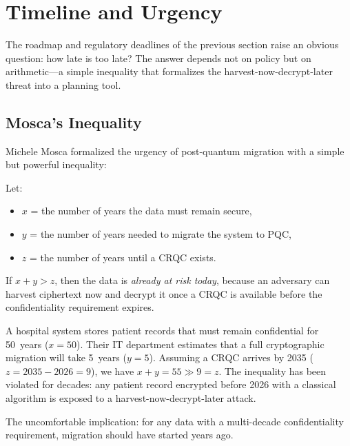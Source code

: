 \section{Timeline and Urgency}
\label{sec:timeline}

The roadmap and regulatory deadlines of the previous section raise an obvious question: how late is too late?  The answer depends not on policy but on arithmetic---a simple inequality that formalizes the harvest-now-decrypt-later threat into a planning tool.

\subsection{Mosca's Inequality}
\label{subsec:mosca}

Michele Mosca formalized the urgency of post-quantum migration with a simple but powerful inequality:

\begin{definition}
\label{def:mosca}
Let:
\begin{itemize}
\item $x$ = the number of years the data must remain secure,
\item $y$ = the number of years needed to migrate the system to PQC,
\item $z$ = the number of years until a CRQC exists.
\end{itemize}
If $x + y > z$, then the data is \emph{already at risk today}, because an adversary can harvest ciphertext now and decrypt it once a CRQC is available before the confidentiality requirement expires.
\end{definition}

\begin{example}
\label{ex:mosca-hospital}
A hospital system stores patient records that must remain confidential for 50~years ($x = 50$).  Their IT department estimates that a full cryptographic migration will take 5~years ($y = 5$).  Assuming a CRQC arrives by 2035 ($z = 2035 - 2026 = 9$), we have $x + y = 55 \gg 9 = z$.  The inequality has been violated for decades: any patient record encrypted before 2026 with a classical algorithm is exposed to a harvest-now-decrypt-later attack.
\end{example}

The uncomfortable implication: for any data with a multi-decade confidentiality requirement, migration should have started years ago.

